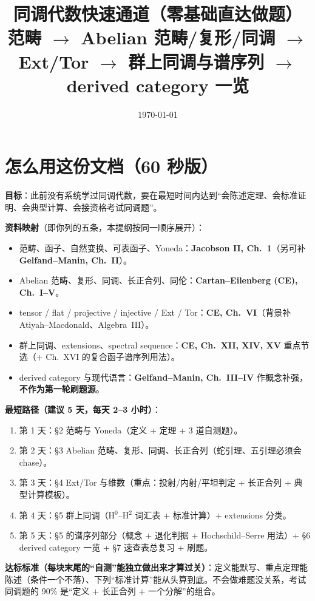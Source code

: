 \documentclass[12pt,a4paper]{ctexart}
\title{同调代数快速通道（零基础直达做题）\\[0.5em]
\large 范畴 $\to$ Abelian 范畴/复形/同调 $\to$ Ext/Tor $\to$ 群上同调与谱序列 $\to$ derived category 一览}
\author{}
\date{\today}
\begin{document}
\maketitle

\tableofcontents
\newpage

\section{怎么用这份文档（60 秒版）}

\textbf{目标}：此前没有系统学过同调代数，要在最短时间内达到“会陈述定理、会标准证明、会典型计算、会接资格考试同调题”。

\textbf{资料映射}（即你列的五条，本提纲按同一顺序展开）：
\begin{itemize}
  \item 范畴、函子、自然变换、可表函子、Yoneda：\textbf{Jacobson II, Ch.~1}（另可补 \textbf{Gelfand--Manin, Ch.~II}）。
  \item Abelian 范畴、复形、同调、长正合列、同伦：\textbf{Cartan--Eilenberg (CE), Ch.~I--V}。
  \item tensor / flat / projective / injective / Ext / Tor：\textbf{CE, Ch.~VI}（背景补 Atiyah--Macdonald、Algebra~III）。
  \item 群上同调、extensions、spectral sequence：\textbf{CE, Ch.~XII, XIV, XV} 重点节选（+ Ch.~XVI 的复合函子谱序列用法）。
  \item derived category 与现代语言：\textbf{Gelfand--Manin, Ch.~III--IV} 作概念补强，\textbf{不作为第一轮刷题源}。
\end{itemize}

\textbf{最短路径（建议 5 天，每天 2--3 小时）}：
\begin{enumerate}
  \item 第 1 天：\S2 范畴与 Yoneda（定义 + 定理 + 3 道自测题）。
  \item 第 2 天：\S3 Abelian 范畴、复形、同调、长正合列（蛇引理、五引理必须会 chase）。
  \item 第 3 天：\S4 Ext/Tor 与维数（重点：投射/内射/平坦判定 + 长正合列 + 典型计算模板）。
  \item 第 4 天：\S5 群上同调（H$^0$--H$^2$ 词汇表 + 标准计算）+ extensions 分类。
  \item 第 5 天：\S5 的谱序列部分（概念 + 退化判据 + Hochschild--Serre 用法）+ \S6 derived category 一览 + \S7 速查表总复习 + 刷题。
\end{enumerate}

\textbf{达标标准（每块末尾的“自测”能独立做出来才算过关）}：定义能默写、重点定理能陈述（条件一个不落）、下列“标准计算”能从头算到底。不会做难题没关系，考试同调题的 90\% 是“定义 + 长正合列 + 一个分解”的组合。
\end{document}

